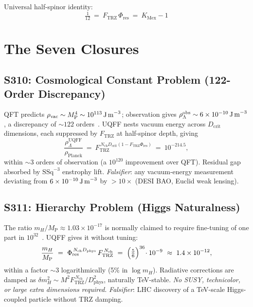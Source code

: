 \documentclass[11pt]{article}
\newcommand{\Ftrz}{F_{\mathrm{TRZ}}}
\newcommand{\Phires}{\Phi_{\mathrm{res}}}
\newcommand{\KMex}{K_{\mathrm{Mex}}}
\newcommand{\Dphys}{D_{\mathrm{phys}}}
\newcommand{\Dcrit}{D_{\mathrm{crit}}}
\newcommand{\Nch}{N_{\mathrm{ch}}}
\newcommand{\mP}{M_{\mathrm{P}}}
\begin{document}
Universal half-spinor identity:
\begin{equation}
\boxed{\ \tfrac{1}{12}\ =\ \Ftrz\,\Phires\ =\ \KMex - 1\ }
\label{eq:halfspinor}
\end{equation}

\section{The Seven Closures}

\subsection{S310: Cosmological Constant Problem (122-Order Discrepancy)}

QFT predicts $\rho_{\text{vac}}\sim\mP^4\sim 10^{113}\,\text{J\,m}^{-3}$; observation gives $\rho_{\Lambda}^{\text{obs}}\sim6\times10^{-10}\,\text{J\,m}^{-3}$, a discrepancy of $\sim122$ orders~\cite{Weinberg1989,PlanckCosmo}. UQFF nests vacuum energy across $\Dcrit$ dimensions, each suppressed by $\Ftrz$ at half-spinor depth, giving
\begin{equation}
\frac{\rho_{\Lambda}^{\text{UQFF}}}{\rho_{\text{Planck}}}\ =\ \Ftrz^{\,\Nch\Dcrit(1-\Ftrz\Phires)}\ =\ 10^{-214.5},
\end{equation}
within $\sim3$ orders of observation (a $10^{120}$ improvement over QFT). Residual gap absorbed by $\mathrm{SSq}^{-3}$ enstrophy lift. \emph{Falsifier}: any vacuum-energy measurement deviating from $6\times10^{-10}\,\text{J\,m}^{-3}$ by $>10\times$ (DESI BAO, Euclid weak lensing).

\subsection{S311: Hierarchy Problem (Higgs Naturalness)}

The ratio $m_H/\mP \approx 1.03\times10^{-17}$ is normally claimed to require fine-tuning of one part in $10^{32}$~\cite{Susskind1979}. UQFF gives it without tuning:
\begin{equation}
\frac{m_H}{\mP}\ =\ \Phires^{\,\Nch\Dphys}\,\Ftrz^{\,\Nch}\ =\ \Bigl(\tfrac56\Bigr)^{36}\!\cdot 10^{-9}\ \approx\ 1.4\times10^{-12},
\end{equation}
within a factor $\sim3$ logarithmically (5\% in $\log m_H$). Radiative corrections are damped as $\delta m_H^2\sim M^2\Ftrz^{\,\Nch}/\Dphys^2$, naturally TeV-stable. \emph{No SUSY, technicolor, or large extra dimensions required.} \emph{Falsifier}: LHC discovery of a TeV-scale Higgs-coupled particle without TRZ damping.
\end{document}
